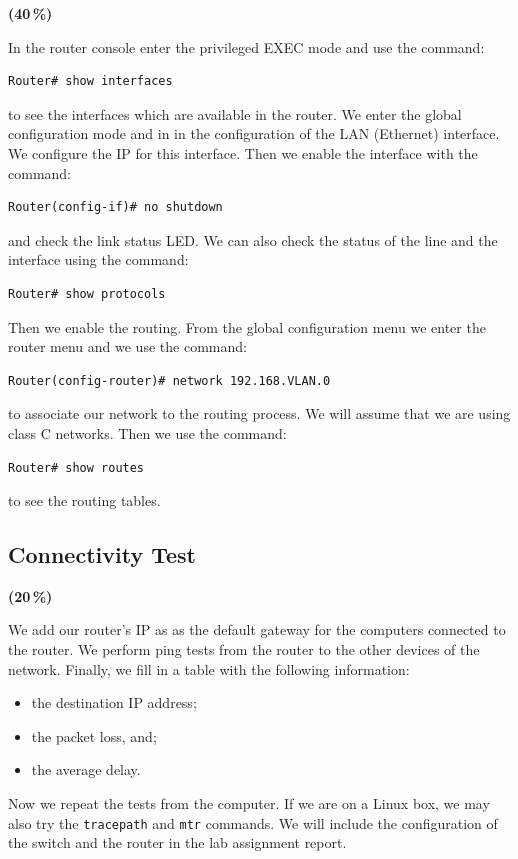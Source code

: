 {\color{red}\textbf{(40\,\%)}}

In the router console enter the privileged EXEC mode and use the command:

\begin{lstlisting}
Router# show interfaces
\end{lstlisting}

to see the interfaces which are available in the router. We enter the global configuration mode and in in the configuration of the LAN (Ethernet) interface. We configure the IP for this interface. Then we enable the interface with the command:

\begin{lstlisting}
Router(config-if)# no shutdown
\end{lstlisting}

and check the link status LED. We can also check the status of the line and the interface using the command:

\begin{lstlisting}
Router# show protocols
\end{lstlisting}

Then we enable the routing. From the global configuration menu we enter the router menu and we use the command:

\begin{lstlisting}
Router(config-router)# network 192.168.VLAN.0
\end{lstlisting}

to associate our network to the routing process. We will assume that we are using class C networks. Then we use the command:

\begin{lstlisting}
Router# show routes
\end{lstlisting}

to see the routing tables.

\subsection{Connectivity Test}

{\color{red}\textbf{(20\,\%)}}

We add our router's IP as as the default gateway for the computers connected to the router. We perform ping tests from the router to the other devices of the network. Finally, we fill in a table with the following information:

\begin{itemize}
\item the destination IP address;
\item the packet loss, and;
\item the average delay.
\end{itemize}

Now we repeat the tests from the computer. If we are on a Linux box, we may also try the \texttt{\color{blue}tracepath} and \texttt{\color{blue}mtr} commands. We will include the configuration of the switch and the router in the lab assignment report.

